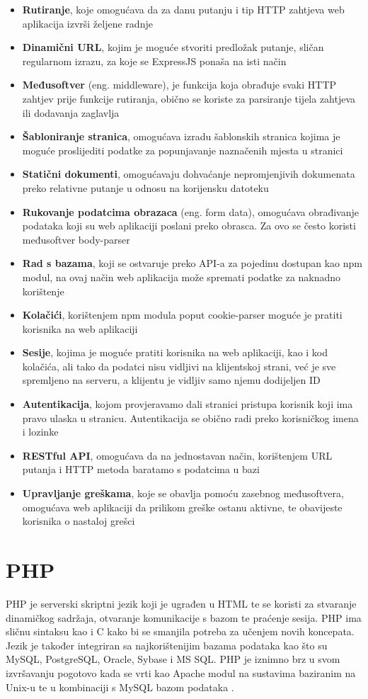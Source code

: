 \documentclass[12pt, oneside, onecolumn]{book}
\begin{document}
{\begin{itemize}
\item \textbf{Rutiranje}, koje omogućava da za danu putanju i tip HTTP zahtjeva web aplikacija izvrši željene radnje
\item \textbf{Dinamični URL}, kojim je moguće stvoriti predložak putanje, sličan regularnom izrazu, za koje se ExpressJS ponaša na isti način
\item \textbf{Međusoftver} (eng. middleware), je funkcija koja obrađuje svaki HTTP zahtjev prije funkcije rutiranja, obično se koriste za parsiranje tijela zahtjeva ili dodavanja zaglavlja
\item \textbf{Šabloniranje stranica}, omogućava izradu šablonskih stranica kojima je moguće proslijediti podatke za popunjavanje naznačenih mjesta u stranici
\item \textbf{Statični dokumenti}, omogućavaju dohvaćanje nepromjenjivih dokumenata preko relativne putanje u odnosu na korijensku datoteku
\item \textbf{Rukovanje podatcima obrazaca} (eng. form data), omogućava obrađivanje podataka koji su web aplikaciji poslani preko obrasca. Za ovo se često koristi međusoftver body-parser
\item \textbf{Rad s bazama}, koji se ostvaruje preko API-a za pojedinu dostupan kao npm modul, na ovaj način web aplikacija može spremati podatke za naknadno korištenje
\item \textbf{Kolačići}, korištenjem npm modula poput cookie-parser moguće je pratiti korisnika na web aplikaciji
\item \textbf{Sesije}, kojima je moguće pratiti korisnika na web aplikaciji, kao i kod kolačića, ali tako da podatci nisu vidljivi na klijentskoj strani, već je sve spremljeno na serveru, a klijentu je vidljiv samo njemu dodijeljen ID
\item \textbf{Autentikacija}, kojom provjeravamo dali stranici pristupa korisnik koji ima pravo ulaska u stranicu. Autentikacija se obično radi preko korisničkog imena i lozinke
\item \textbf{RESTful API}, omogućava da na jednostavan način, korištenjem URL putanja i HTTP metoda baratamo s podatcima u bazi
\item \textbf{Upravljanje greškama}, koje se obavlja pomoću zasebnog međusoftvera, omogućava web aplikaciji da prilikom greške ostanu aktivne, te obavijeste korisnika o nastaloj grešci
\end{itemize}

\section{PHP}
PHP je serverski skriptni jezik koji je ugrađen u HTML te se koristi za stvaranje dinamičkog sadržaja, otvaranje komunikacije s bazom te praćenje sesija. PHP ima sličnu sintaksu kao i C kako bi se smanjila potreba za učenjem novih koncepata. Jezik je također integriran sa najkorištenijim bazama podataka kao što su MySQL, PostgreSQL, Oracle, Sybase i MS SQL. PHP je iznimno brz u svom izvršavanju pogotovo kada se vrti kao Apache modul na sustavima baziranim na Unix-u te u kombinaciji s MySQL bazom podataka \cite{php}.

}
\end{document}
